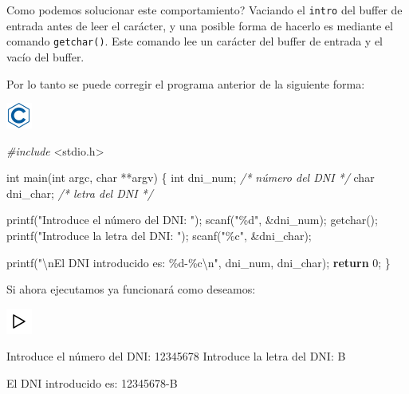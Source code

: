 \documentclass[
]{book}
\newenvironment{Shaded}{\begin{snugshade}}{\end{snugshade}}
\newcommand{\CommentTok}[1]{\textcolor[rgb]{0.56,0.35,0.01}{\textit{#1}}}
\newcommand{\ControlFlowTok}[1]{\textcolor[rgb]{0.13,0.29,0.53}{\textbf{#1}}}
\newcommand{\DataTypeTok}[1]{\textcolor[rgb]{0.13,0.29,0.53}{#1}}
\newcommand{\DecValTok}[1]{\textcolor[rgb]{0.00,0.00,0.81}{#1}}
\newcommand{\ImportTok}[1]{#1}
\newcommand{\NormalTok}[1]{#1}
\newcommand{\PreprocessorTok}[1]{\textcolor[rgb]{0.56,0.35,0.01}{\textit{#1}}}
\newcommand{\SpecialCharTok}[1]{\textcolor[rgb]{0.00,0.00,0.00}{#1}}
\newcommand{\StringTok}[1]{\textcolor[rgb]{0.31,0.60,0.02}{#1}}
\begin{document}
Como podemos solucionar este comportamiento? Vaciando el \texttt{intro} del buffer de entrada antes de leer el carácter, y una posible forma de hacerlo es mediante el comando \texttt{getchar()}. Este comando lee un carácter del buffer de entrada y el vacío del buffer.

Por lo tanto se puede corregir el programa anterior de la siguiente forma:

\includegraphics{./img/c.png}

\begin{Shaded}
\begin{Highlighting}[]
\PreprocessorTok{\#include }\ImportTok{\textless{}stdio.h\textgreater{}}

\DataTypeTok{int}\NormalTok{ main(}\DataTypeTok{int}\NormalTok{ argc, }\DataTypeTok{char}\NormalTok{ **argv) \{}
    \DataTypeTok{int}\NormalTok{ dni\_num;    }\CommentTok{/* número del DNI */}
    \DataTypeTok{char}\NormalTok{ dni\_char;  }\CommentTok{/* letra del DNI */}

\NormalTok{    printf(}\StringTok{"Introduce el número del DNI: "}\NormalTok{);}
\NormalTok{    scanf(}\StringTok{"\%d"}\NormalTok{, \&dni\_num);}
\NormalTok{    getchar();}
\NormalTok{    printf(}\StringTok{"Introduce la letra del DNI: "}\NormalTok{);}
\NormalTok{    scanf(}\StringTok{"\%c"}\NormalTok{, \&dni\_char);}

\NormalTok{    printf(}\StringTok{"}\SpecialCharTok{\textbackslash{}n}\StringTok{El DNI introducido es: \%d{-}\%c}\SpecialCharTok{\textbackslash{}n}\StringTok{"}\NormalTok{, dni\_num, dni\_char);}
    \ControlFlowTok{return} \DecValTok{0}\NormalTok{;}
\NormalTok{\}}
\end{Highlighting}
\end{Shaded}

Si ahora ejecutamos ya funcionará como deseamos:

\includegraphics{./img/play.png}

\begin{Shaded}
\begin{Highlighting}[]
\NormalTok{Introduce el número del DNI: }\DecValTok{12345678}
\NormalTok{Introduce la letra del DNI: B}

\NormalTok{El DNI introducido es: }\DecValTok{12345678}\NormalTok{{-}B}
\end{Highlighting}
\end{Shaded}
\end{document}
